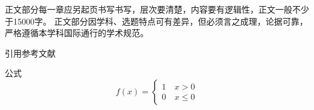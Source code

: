 \xiaosi\song

正文部分每一章应另起页书写书写，层次要清楚，内容要有逻辑性，正文一般不少于15000字。
正文部分因学科、选题特点可有差异，但必须言之成理，论据可靠，严格遵循本学科国际通行的学术规范。

引用参考文献
\cite{zzhml}

公式
\begin{equation}
    f(x) = \left\{
    \begin{array}{c}
        1 \quad x > 0 \\
        0 \quad x \leq 0 
    \end{array}    
    \right.
\end{equation}